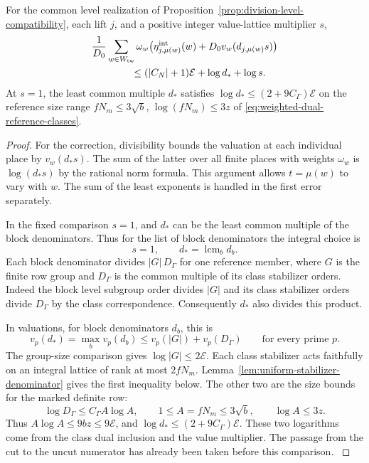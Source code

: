 \begin{proposition}\label{prop:weighted-dual-cost}
For the common level realization of
Proposition~\ref{prop:division-level-compatibility}, each lift \(j\),
and a positive
integer value-lattice multiplier \(s\),
\begin{align*}
 &\frac{1}{D_0}
     \sum_{w\in W_{\mathrm{tw}}}\omega_w
        \bigl(\eta^{\rm int}_{j,\mu(w)}(w)
                      +D_0 v_w(d_{j,\mu(w)}s)\bigr) \\
 &\hspace{40pt}\le (|C_N|+1)\mathcal E+\log d_*+\log s .
\end{align*}
At \(s=1\), the least common multiple \(d_*\) satisfies
\(\log d_*\le(2+9C_\Gamma)\mathcal E\) on the reference size range \(fN_m\le3\sqrt b\), \(\log(fN_m)\le3z\) of \eqref{eq:weighted-dual-reference-classes}.
\end{proposition}

\begin{proof}
For the correction, divisibility bounds the valuation
at each individual place by \(v_w(d_*s)\).
The sum of the latter over all finite places with
weights \(\omega_w\) is \(\log(d_*s)\) by the rational
norm formula. This argument allows \(t=\mu(w)\) to vary
with \(w\). The sum of the least exponents is handled
in the first error separately.

In the fixed comparison \(s=1\), and \(d_*\) can be the
least common multiple of the block denominators.
Thus for the list of block denominators the integral choice is
\[
  s=1,\qquad d_*=\operatorname{lcm}_b d_b .
\]
Each block denominator divides \(|G|\,D_{\Gamma}\)
for one reference member, where \(G\) is the finite row
group and \(D_{\Gamma}\) is the common multiple of its
class stabilizer orders. Indeed the block level subgroup
order divides \(|G|\) and its class stabilizer orders
divide \(D_{\Gamma}\) by the class correspondence.
Consequently \(d_*\) also divides this product.

In valuations, for block denominators \(d_b\), this is
\[
  v_p(d_*)=\max_b v_p(d_b)\le v_p(|G|)+v_p(D_\Gamma)\qquad\text{for every prime }p.
\]
 The
group-size comparison gives \(\log|G|\le2\mathcal E\).
Each class stabilizer acts faithfully on an integral lattice of rank at most \(2fN_m\). Lemma~\ref{lem:uniform-stabilizer-denominator} gives the first inequality below. The other two are the size bounds for the marked definite row:
\begin{equation}\label{eq:weighted-dual-reference-classes}
 \log D_{\Gamma}\le C_\Gamma A\log A,\qquad
 1\le A=fN_m\le3\sqrt b,\qquad \log A\le3z .
\end{equation} Thus
\(A\log A\le9bz\le9\mathcal E\), and
\(\log d_*\le(2+9C_\Gamma)\mathcal E\). These two
logarithms come from the class dual inclusion and the
value multiplier. The passage from the cut to the
uncut numerator has already been taken before this
comparison.
\label{cor:division-level-pins-3}
\end{proof}
